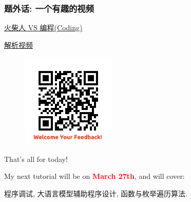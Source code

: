 \documentclass[handout]{ctexbeamer}
\begin{document}
        \begin{frame}
            \frametitle{题外话: 一个有趣的视频}
            \centering
            \href{https://www.bilibili.com/video/BV11RXRYuEdL/?share_source=copy_web}{火柴人 VS 编程(Coding) }
            \vspace{1em}

            \href{https://www.bilibili.com/video/BV1ghXZYpEX4/?share_source=copy_web}{解析视频}
        \end{frame}
    \begin{frame}
        \begin{figure}
            \centering
            \includegraphics[width=0.4\textwidth]{./images/qrcode.jpg}
        \end{figure}
        \begin{center}
            \Large That's all for today!
        \end{center}
        \begin{center}
            My next tutorial will be on \textcolor{red}{\textbf{March 27th}}, and will cover:

            \vspace{1em}
            程序调试, 大语言模型辅助程序设计, 函数与枚举遍历算法.
        \end{center}
    \end{frame}
\end{document}
